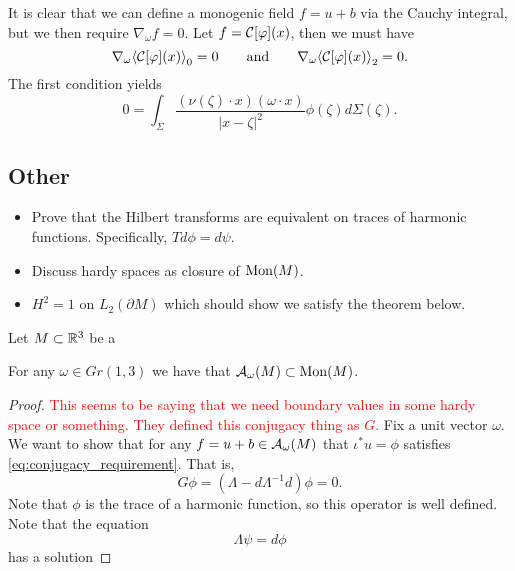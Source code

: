 \documentclass[12pt]{article}
\begin{document}

It is clear that we can define a monogenic field $f=u+b$ via the Cauchy integral, but we then require $\nabla_\omega f = 0$.  Let $f=\mathcal{C}[\varphi](x)$, then we must have
\[
\nabla_\omega \proj{0}{\cauchy[\varphi](x)} = 0 \qquad \textrm{and} \qquad \nabla_\omega \proj{2}{\cauchy[\varphi](x)}=0.
\]
The first condition yields
\[
0 = \int_\Sigma \frac{(\nu(\zeta)\cdot x) (\omega \cdot x)}{|x-\zeta|^2} \phi(\zeta) d\Sigma(\zeta).
\]




\subsection{Other}

\begin{itemize}
    \item Prove that the Hilbert transforms are equivalent on traces of harmonic functions. Specifically, $Td\phi = d\psi$.  
    \item Discuss hardy spaces as closure of $\operatorname{Mon}(M)$. 
    \item $H^2=1$ on $L_2(\partial M)$ which should show we satisfy the theorem below.
\end{itemize}

Let $M\subset \mathbb{R}^3$ be a 










\begin{theorem}
    For any $\omega \in Gr(1,3)$ we have that $\mathcal{A}_{\omega}(M)\subset \operatorname{Mon}(M)$. 
\end{theorem}
\begin{proof}
    \textcolor{red}{This seems to be saying that we need boundary values in some hardy space or something. They defined this conjugacy thing as $G$.}
    Fix a unit vector $\omega$.  We want to show that for any $f=u+b\in \mathcal{A}_{\omega}(M)$ that $\iota^* u=\phi$ satisfies \ref{eq:conjugacy_requirement}.  That is,
    \[
        G\phi = (\Lambda - d\Lambda^{-1}d) \phi = 0.
    \]
    Note that $\phi$ is the trace of a harmonic function, so this operator is well defined.  Note that the equation
    \[
        \Lambda \psi = d \phi
    \]
    has a solution
\end{proof}
\end{document}
